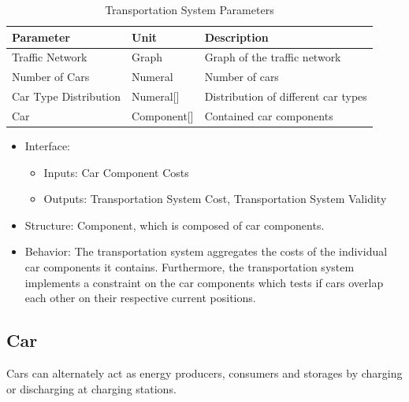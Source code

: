 	 \begin{table}[h]
	 	\renewcommand{\arraystretch}{1.3}
	 	\caption{Transportation System Parameters}
	 	\centering
	 	\begin{tabular}{lll}
	 		\hline
	 		\textbf{Parameter}                    & \textbf{Unit} & \textbf{Description} \\ \hline
	 		Traffic Network                  	  & Graph          & Graph of the traffic network      \\
	 		Number of Cars                          & Numeral    & Number of cars      \\ 
	 		Car Type Distribution                          & Numeral[]    & Distribution of different car types      \\ 
	 		Car                          & Component[]    & Contained car components      \\ \hline
	 	\end{tabular}
	 \end{table}
	 \begin{itemize}
	\item Interface:
			\begin{itemize}
				\item Inputs: Car Component Costs
				\item Outputs: Transportation System Cost, Transportation System Validity
			\end{itemize}	 
	\item Structure: Component, which is composed of car components.
	\item Behavior: The transportation system aggregates the costs of the individual car components it contains. Furthermore, the transportation system implements a constraint on the car components which tests if cars overlap each other on their respective current positions.
\end{itemize}

\subsection{Car}

Cars can alternately act as energy producers, consumers and storages by charging or discharging at charging stations.

